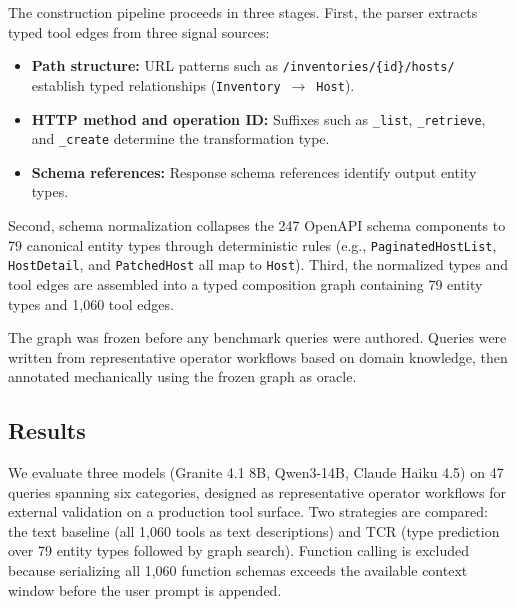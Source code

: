 The construction pipeline proceeds in three stages.
First, the parser extracts typed tool edges from three signal sources:

\begin{itemize}
    \item \textbf{Path structure:} URL patterns such as \texttt{/inventories/\{id\}/hosts/} establish typed relationships (\texttt{Inventory}~$\rightarrow$~\texttt{Host}).
    \item \textbf{HTTP method and operation ID:} Suffixes such as \texttt{\_list}, \texttt{\_retrieve}, and \texttt{\_create} determine the transformation type.
    \item \textbf{Schema references:} Response schema references identify output entity types.
\end{itemize}

Second, schema normalization collapses the 247 OpenAPI schema components to 79 canonical entity types through deterministic rules (e.g., \texttt{PaginatedHostList}, \texttt{HostDetail}, and \texttt{PatchedHost} all map to \texttt{Host}).
Third, the normalized types and tool edges are assembled into a typed composition graph containing 79 entity types and 1,060 tool edges.

The graph was frozen before any benchmark queries were authored.
Queries were written from representative operator workflows based on domain knowledge, then annotated mechanically using the frozen graph as oracle.

\subsection{Results}
\label{sec:aap-results}

We evaluate three models (Granite 4.1 8B, Qwen3-14B, Claude Haiku 4.5) on 47 queries spanning six categories, designed as representative operator workflows for external validation on a production tool surface.
Two strategies are compared: the text baseline (all 1,060 tools as text descriptions) and TCR (type prediction over 79 entity types followed by graph search).
Function calling is excluded because serializing all 1,060 function schemas exceeds the available context window before the user prompt is appended.

